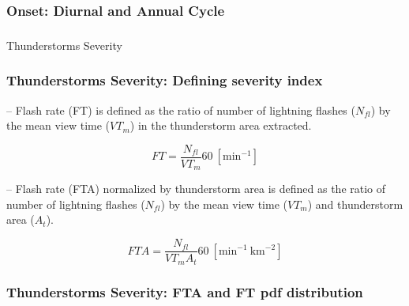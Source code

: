 \documentclass[smaller]{beamer}
\begin{document}
\begin{frame}
\frametitle{Onset: Diurnal and Annual Cycle}

\end{frame} 


\begin{frame}
\frametitle{}

\end{frame}


\begin{frame}
\frametitle{}

\end{frame}




\begin{frame}
\Large Thunderstorms Severity
\end{frame}


\begin{frame}
\frametitle{Thunderstorms Severity: Defining severity index}

-- Flash rate (FT) is defined as the ratio of number of lightning flashes ($N_{fl}$) by the mean view time ($VT_m$) in the thunderstorm area extracted.	

\begin{equation}
FT = \frac{N_{fl} }{VT_m} 60 ~[\mathrm{min^{-1}}]  
\label{eqFT}  
\end{equation}

-- Flash rate (FTA) normalized by thunderstorm area is defined as the ratio of number of lightning flashes ($N_{fl}$) by the mean view time ($VT_m$) and thunderstorm area ($A_t$). 

\begin{equation}
FTA = \frac{N_{fl}}{VT_m A_t } 60 ~[\mathrm{min^{-1}~km^{-2}}]
\label{eqFTA}
\end{equation}


\end{frame}

\begin{frame}
\frametitle{Thunderstorms Severity: FTA and FT pdf distribution}

\end{frame}
\end{document}
